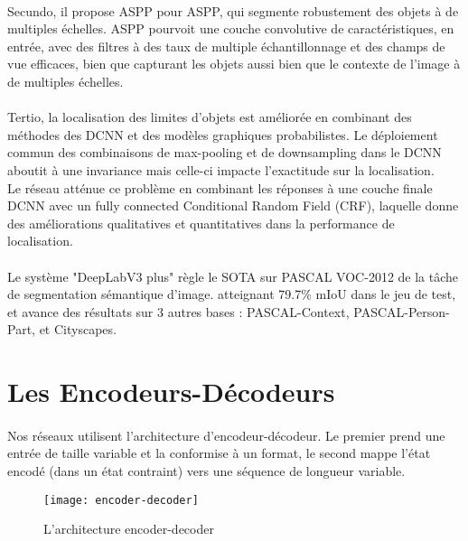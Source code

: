 \documentclass[
10pt,
a4paper, 
oneside, 
headinclude,footinclude, 
]{scrartcl}
\begin{document}
\paragraph{}Secundo, il propose ASPP pour \gls{ASPP}, qui segmente robustement des objets à de multiples échelles. ASPP pourvoit une couche convolutive de caractéristiques, en entrée, avec des filtres à des taux de multiple échantillonnage et des champs de vue efficaces, bien que capturant les objets aussi bien que le contexte de l’image à de multiples échelles.

\paragraph{}Tertio, la localisation des limites d’objets est améliorée en combinant des méthodes des DCNN et des modèles graphiques probabilistes. Le déploiement commun des combinaisons de max-pooling et de downsampling dans le DCNN aboutit à une invariance mais celle-ci impacte l’exactitude sur la localisation.
\\
Le réseau atténue ce problème en combinant les réponses à une couche finale DCNN avec un fully connected Conditional Random Field (CRF), laquelle donne des améliorations qualitatives et quantitatives dans la performance de localisation.

\paragraph{}Le système "DeepLabV3 plus" règle le SOTA sur PASCAL VOC-2012 de la tâche de segmentation sémantique d’image. atteignant 79.7\% mIoU dans le jeu de test, et avance des résultats  sur 3 autres bases : PASCAL-Context, PASCAL-Person-Part, et Cityscapes.
\section{Les Encodeurs-Décodeurs}
\paragraph{}Nos réseaux utilisent l’architecture d’encodeur-décodeur\cite{zhang2020dive}. Le premier prend une entrée de taille variable et la conformise à un format, le second mappe l’état encodé (dans un état contraint) vers une séquence de longueur variable.

\begin{figure}[htb]
\centering 
\texttt{[image: encoder-decoder]} 
\caption[L’architecture encoder-decoder]{L’architecture encoder-decoder} 
\label{fig:data_augmentation} 
\end{figure}
\end{document}
